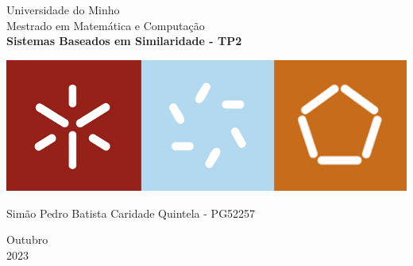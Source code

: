 \documentclass[a4paper, 12pt]{article}
\begin{document}

\begin{titlepage}
	\begin{center}
 
		\Huge{Universidade do Minho}\\
		\large{Mestrado em Matemática e Computação}\\ 
		\vspace{15pt}
        \vspace{95pt}
        \textbf{\large{Sistemas Baseados em Similaridade - TP2 }}\\
		\vspace{3,5cm}
	\end{center}

    \begin{center}
        \includegraphics[scale=0.4]{sbs.png}
    \end{center}
	\begin{flushleft}
		\begin{center}
			Simão Pedro Batista Caridade Quintela - PG52257 \\
	\end{center}
 \end{flushleft}
	\vspace{1cm}
	
	\begin{center}
		\vspace{\fill}
			 Outubro\\
		 2023
			\end{center}
\end{titlepage}

\end{document}
